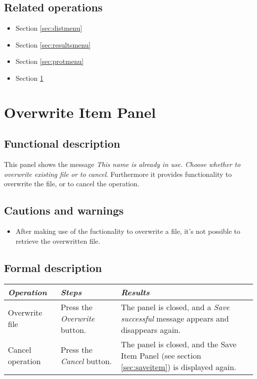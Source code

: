   \subsection*{Related operations}
   \begin{itemize}
   \item Section \ref{sec:distmenu}
   \item Section \ref{sec:resultsmenu}
   \item Section \ref{sec:protmenu}
   \item Section \ref{sec:overwriteitem}
  \end{itemize}

\section{Overwrite Item Panel}
\label{sec:overwriteitem}
  \subsection*{Functional description}
  This panel shows the message \emph{This name is already in use. Choose whether to overwrite existing file or to cancel}. Furthermore it provides functionality to overwrite the file, or to cancel the operation.

  \subsection*{Cautions and warnings}
  \begin{itemize}
  \item After making use of the fuctionality to overwrite a file, it's not possible to retrieve the overwritten file.
  \end{itemize}

  \subsection*{Formal description}
    \begin{tabularx}{\textwidth}{XXX}
    \toprule
    \emph{Operation} & \emph{Steps} & \emph{Results} \\
    \midrule
    Overwrite file & Press the \emph{Overwrite} button. & The panel is closed, and a \emph{Save successful} message appears and disappears again. \\
    \midrule
    Cancel operation & Press the \emph{Cancel} button. & The panel is closed, and the Save Item Panel (see section \ref{sec:saveitem}) is displayed again. \\
    \bottomrule
\end{tabularx}

